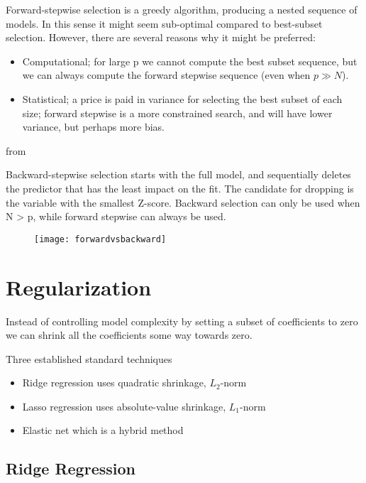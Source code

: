 Forward-stepwise selection is a greedy algorithm, producing a nested sequence of models. In this sense it might seem sub-optimal compared to
best-subset selection. However, there are several reasons why it might be preferred:

\begin{itemize}
  \item Computational; for large p we cannot compute the best subset sequence, but we can always compute the forward stepwise sequence (even when $p \gg N$).
  \item Statistical; a price is paid in variance for selecting the best subset of each size; forward stepwise is a more constrained search, and will have lower variance, but perhaps more bias.
\end{itemize}

from \cite[p.~58]{friedman2016elements}

Backward-stepwise selection starts with the full model, and sequentially deletes the predictor that has the least impact on the fit. The candidate for dropping is the variable with the smallest Z-score. Backward selection can only be used when N > p, while forward stepwise can always be used.

\begin{figure}[H]
  \centering
  \texttt{[image: forwardvsbackward]}
\end{figure}

\section{Regularization}

Instead of controlling model complexity by setting a subset of
coefficients to zero we can shrink all the coefficients some way
towards zero.

Three established standard techniques

\begin{itemize}
  \item Ridge regression uses quadratic shrinkage, $L_2$-norm
  \item Lasso regression uses absolute-value shrinkage, $L_1$-norm
  \item Elastic net which is a hybrid method
\end{itemize}

\subsection{Ridge Regression}

